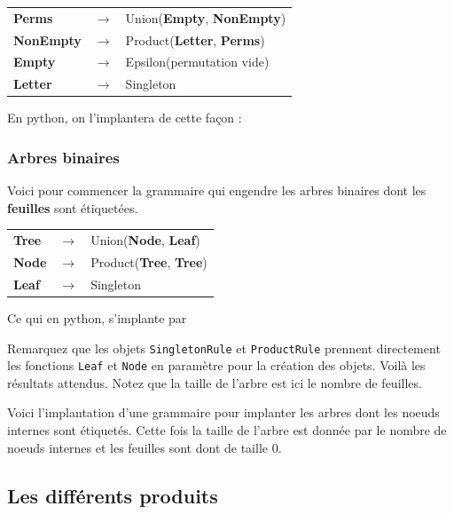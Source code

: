 \documentclass[11pt]{article}
\newcommand{\SingletonRule}{\texttt{SingletonRule}\xspace}
\newcommand{\ProductRule}{\texttt{ProductRule}\xspace}
\newcommand{\Leaf}{\texttt{Leaf}\xspace}
\newcommand{\Node}{\texttt{Node}\xspace}
\begin{document}
\begin{tabular}{lll}
\textbf{Perms} & $\rightarrow$ & Union(\textbf{Empty}, \textbf{NonEmpty}) \\
\textbf{NonEmpty} & $\rightarrow$ & Product(\textbf{Letter}, \textbf{Perms}) \\
\textbf{Empty} & $\rightarrow$ & Epsilon(permutation vide) \\
\textbf{Letter} & $\rightarrow$ & Singleton
\end{tabular}

En python, on l'implantera de cette façon :



\subsubsection{Arbres binaires}

Voici pour commencer la grammaire qui engendre les arbres binaires
dont les \textbf{feuilles} sont étiquetées.

\begin{tabular}{lll}
\textbf{Tree} & $\rightarrow$ & Union(\textbf{Node}, \textbf{Leaf}) \\
\textbf{Node} & $\rightarrow$ & Product(\textbf{Tree}, \textbf{Tree}) \\
\textbf{Leaf} & $\rightarrow$ & Singleton
\end{tabular}

Ce qui en python, s'implante par



Remarquez que les objets \SingletonRule et \ProductRule prennent
directement les fonctions \Leaf et \Node en paramètre pour
la création des objets. Voilà les résultats attendus. Notez que
la taille de l'arbre est ici le nombre de feuilles.



Voici l'implantation d'une grammaire pour implanter les arbres dont les noeuds
internes sont étiquetés. Cette fois la taille de l'arbre est donnée par le
nombre de noeuds internes et les feuilles sont dont de taille 0.




\subsection{Les différents produits}
\label{seq:product}
\end{document}
